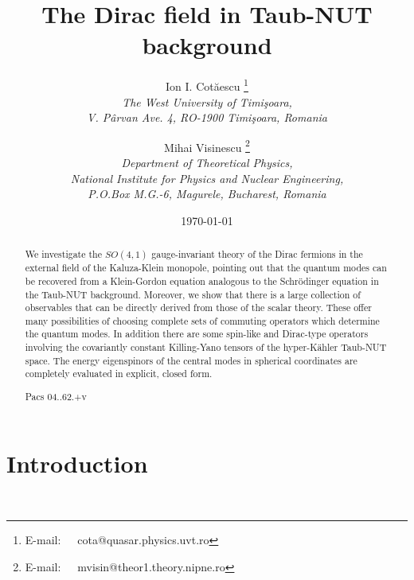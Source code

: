 \documentclass[a4paper,12pt]{article}
\begin{document}
\title{The Dirac field in Taub-NUT background}

\author{Ion I. Cot\u aescu \thanks{E-mail:~~~cota@quasar.physics.uvt.ro}\\ 
{\small \it The West University of Timi\c soara,}\\
       {\small \it V. P\^ arvan Ave. 4, RO-1900 Timi\c soara, Romania}
\and
Mihai Visinescu \thanks{E-mail:~~~mvisin@theor1.theory.nipne.ro}\\
{\small \it Department of Theoretical Physics,}\\
{\small \it National Institute for Physics and Nuclear Engineering,}\\
{\small \it P.O.Box M.G.-6, Magurele, Bucharest, Romania}}
\date{\today}

\maketitle

\begin{abstract}
We investigate the $SO(4,1)$ gauge-invariant theory of the Dirac fermions 
in the external field of the Kaluza-Klein monopole, pointing out that the 
quantum modes can be recovered from a Klein-Gordon equation analogous to the 
Schr\" odinger equation in the Taub-NUT background. Moreover, we show that 
there is a large collection of observables  that can be directly derived 
from those of the scalar theory. These offer many possibilities of choosing 
complete sets of commuting operators which determine the quantum modes. 
In addition there are some spin-like and Dirac-type operators involving 
the covariantly constant Killing-Yano tensors of the hyper-K\"ahler 
Taub-NUT space. The energy eigenspinors of the central modes in spherical 
coordinates are completely evaluated in explicit, closed form. 

Pacs 04..62.+v

\end{abstract}

\newpage

\section{Introduction}
\
\end{document}
